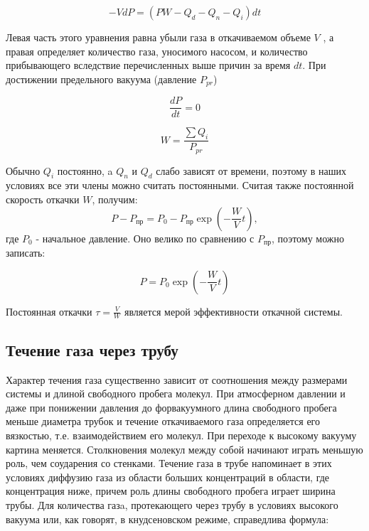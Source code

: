 \documentclass[a4paper]{article}
\begin{document}
\begin{equation}
	-VdP=(PW-Q_d-Q_n-Q_i)dt
\end{equation}

Левая часть этого уравнения равна убыли газа в откачиваемом объеме $V$ , а правая определяет количество газа, уносимого насосом, и количество прибывающего вследствие перечисленных выше причин
за время $dt$. При достижении предельного вакуума (давление $P_{pr}$)

\begin{equation}
	\frac{dP}{dt}=0
\end{equation}

\begin{equation}
	W=\frac{\sum Q_i}{P_{pr}}
\end{equation}

Обычно $Q_i$ постоянно, a $Q_n$ и $Q_d$ слабо зависят от времени,
поэтому в наших условиях все эти члены можно считать постоянными.
Считая также постоянной скорость откачки $W$, получим:
\begin{equation}
    P - P_\text{пр} = P_0 - P_\text{пр} \exp \left( -\frac{W}{V} t \right),
\end{equation}
где $P_0$ - начальное давление. Оно велико по сравнению с $P_\text{пр}$, поэтому
можно записать:

\begin{equation}
    P = P_0 \exp \left( -\frac{W}{V} t \right)
\end{equation}

Постоянная откачки $\tau = \frac{V}{W}$ является мерой эффективности откачной системы.

\subsection{Течение газа через трубу}

Характер течения газа существенно зависит от соотношения между размерами системы
и длиной свободного пробега молекул.
При атмосферном давлении и даже при понижении давления
до форвакуумного длина свободного пробега меньше диаметра трубок
и течение откачиваемого газа определяется его вязкостью,
т.е. взаимодействием его молекул. При переходе к высокому вакууму картина меняется.
Столкновения молекул между собой начинают играть меньшую роль, чем соударения со стенками.
Течение газа в трубе напоминает в этих условиях диффузию газа
из области больших концентраций в области,
где концентрация ниже, причем роль длины свободного пробега играет ширина трубы.
Для количества газa, протекающего через трубу в условиях высокого вакуума или,
как говорят, в кнудсеновском режиме, справедлива формула:
\end{document}

